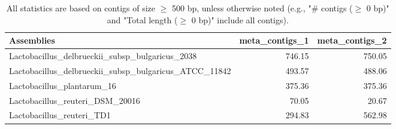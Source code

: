 \documentclass[12pt,a4paper]{article}
\begin{document}
\begin{table}[ht]
\begin{center}
\caption{All statistics are based on contigs of size $\geq$ 500 bp, unless otherwise noted (e.g., "\# contigs ($\geq$ 0 bp)" and "Total length ($\geq$ 0 bp)" include all contigs).}
\begin{tabular}{|l*{2}{|r}|}
\hline
Assemblies & meta\_contigs\_1 & meta\_contigs\_2 \\ \hline
Lactobacillus\_delbrueckii\_subsp\_bulgaricus\_2038 & 746.15 & 750.05 \\ \hline
Lactobacillus\_delbrueckii\_subsp\_bulgaricus\_ATCC\_11842 & 493.57 & 488.06 \\ \hline
Lactobacillus\_plantarum\_16 & 375.36 & 375.36 \\ \hline
Lactobacillus\_reuteri\_DSM\_20016 & 70.05 & 20.67 \\ \hline
Lactobacillus\_reuteri\_TD1 & 294.83 & 562.98 \\ \hline
\end{tabular}
\end{center}
\end{table}
\end{document}
